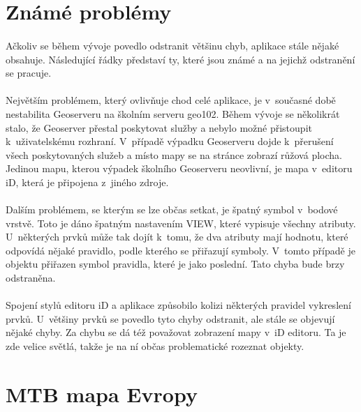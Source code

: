 \documentclass[11pt,a4paper,titlepage,oneside]{book}
\begin{document}
		\section{Známé problémy}
			\paragraph{} Ačkoliv se během vývoje povedlo odstranit většinu chyb, aplikace stále nějaké obsahuje. Následující řádky představí ty, které jsou známé a na jejichž odstranění se pracuje.
			\paragraph{} Největším problémem, který ovlivňuje chod celé aplikace, je v~současné době nestabilita Geoserveru na školním serveru geo102. Během vývoje se několikrát stalo, že Geoserver přestal poskytovat služby a nebylo možné přistoupit k~uživatelskému rozhraní. V~případě výpadku Geoserveru dojde k~přerušení všech poskytovaných služeb a místo mapy se na stránce zobrazí růžová plocha. Jedinou mapu, kterou výpadek školního Geoserveru neovlivní, je mapa v~editoru iD, která je připojena z~jiného zdroje.
			\paragraph{} Dalším problémem, se kterým se lze občas setkat, je špatný symbol v~bodové vrstvě. Toto je dáno špatným nastavením VIEW, které vypisuje všechny atributy. U~některých prvků může tak dojít k~tomu, že dva atributy mají hodnotu, které odpovídá nějaké pravidlo, podle kterého se přiřazují symboly. V~tomto případě je objektu přiřazen symbol pravidla, které je jako poslední. Tato chyba bude brzy odstraněna.
			\paragraph{} Spojení stylů editoru iD a aplikace způsobilo kolizi některých pravidel vykreslení prvků. U~většiny prvků se povedlo tyto chyby odstranit, ale stále se objevují nějaké chyby. Za chybu se dá též považovat zobrazení mapy v~iD editoru. Ta je zde velice světlá, takže je na ní občas problematické rozeznat objekty.

		\section{MTB mapa Evropy}

\end{document}
